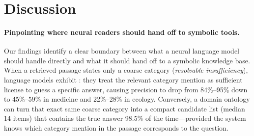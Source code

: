 

\section{Discussion}

\paragraph{Pinpointing where neural readers should hand off to symbolic tools.}
Our findings identify a clear boundary between what a neural language model should handle directly and what it should hand off to a symbolic knowledge base. When a retrieved passage states only a coarse category (\emph{resolvable insufficiency}), language models exhibit \clade{}: they treat the relevant category mention as sufficient license to guess a specific answer, causing precision to drop from 84\%--95\% down to 45\%--59\% in medicine and 22\%--28\% in ecology. Conversely, a domain ontology can turn that exact same coarse category into a compact candidate list (median 14 items) that contains the true answer 98.5\% of the time—provided the system knows which category mention in the passage corresponds to the question.

